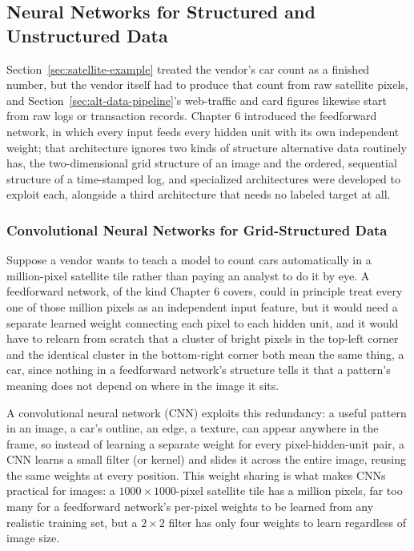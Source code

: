 \documentclass[../ai_in_finance]{subfiles}
\begin{document}
\subsection{Neural Networks for Structured and Unstructured Data}
\label{sec:nn-structured-unstructured}

Section~\ref{sec:satellite-example} treated the vendor's car count as a finished number, but the vendor itself had to produce that count from raw satellite pixels, and Section~\ref{sec:alt-data-pipeline}'s web-traffic and card figures likewise start from raw logs or transaction records. Chapter 6 introduced the feedforward network, in which every input feeds every hidden unit with its own independent weight; that architecture ignores two kinds of structure alternative data routinely has, the two-dimensional grid structure of an image and the ordered, sequential structure of a time-stamped log, and specialized architectures were developed to exploit each, alongside a third architecture that needs no labeled target at all.

\subsubsection*{Convolutional Neural Networks for Grid-Structured Data}

Suppose a vendor wants to teach a model to count cars automatically in a million-pixel satellite tile rather than paying an analyst to do it by eye. A feedforward network, of the kind Chapter 6 covers, could in principle treat every one of those million pixels as an independent input feature, but it would need a separate learned weight connecting each pixel to each hidden unit, and it would have to relearn from scratch that a cluster of bright pixels in the top-left corner and the identical cluster in the bottom-right corner both mean the same thing, a car, since nothing in a feedforward network's structure tells it that a pattern's meaning does not depend on where in the image it sits.

A convolutional neural network (CNN) exploits this redundancy: a useful pattern in an image, a car's outline, an edge, a texture, can appear anywhere in the frame, so instead of learning a separate weight for every pixel-hidden-unit pair, a CNN learns a small filter (or kernel) and slides it across the entire image, reusing the same weights at every position. This weight sharing is what makes CNNs practical for images: a $1000\times1000$-pixel satellite tile has a million pixels, far too many for a feedforward network's per-pixel weights to be learned from any realistic training set, but a $2\times2$ filter has only four weights to learn regardless of image size.
\end{document}

